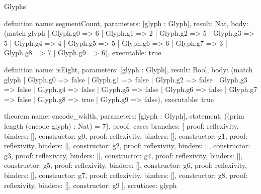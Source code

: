 \begin{lexlean}{Glyphs}
\begin{semanticmodule}
definition{
  name: segmentCount,
  parameters: [glyph : Glyph],
  result: Nat,
  body: (match glyph
    | Glyph.g0 => 6
    | Glyph.g1 => 2
    | Glyph.g2 => 5
    | Glyph.g3 => 5
    | Glyph.g4 => 4
    | Glyph.g5 => 5
    | Glyph.g6 => 6
    | Glyph.g7 => 3
    | Glyph.g8 => 7
    | Glyph.g9 => 6),
  executable: true
}

definition{
  name: isEight,
  parameters: [glyph : Glyph],
  result: Bool,
  body: (match glyph
    | Glyph.g0 => false
    | Glyph.g1 => false
    | Glyph.g2 => false
    | Glyph.g3 => false
    | Glyph.g4 => false
    | Glyph.g5 => false
    | Glyph.g6 => false
    | Glyph.g7 => false
    | Glyph.g8 => true
    | Glyph.g9 => false),
  executable: true
}

theorem{
  name: encode_width,
  parameters: [glyph : Glyph],
  statement: ((prim length (encode glyph) : Nat) = 7),
  proof: cases{
    branches: [
      {proof: reflexivity{}, binders: [], constructor: g0},
      {proof: reflexivity{}, binders: [], constructor: g1},
      {proof: reflexivity{}, binders: [], constructor: g2},
      {proof: reflexivity{}, binders: [], constructor: g3},
      {proof: reflexivity{}, binders: [], constructor: g4},
      {proof: reflexivity{}, binders: [], constructor: g5},
      {proof: reflexivity{}, binders: [], constructor: g6},
      {proof: reflexivity{}, binders: [], constructor: g7},
      {proof: reflexivity{}, binders: [], constructor: g8},
      {proof: reflexivity{}, binders: [], constructor: g9}
    ],
    scrutinee: glyph
  }
}
\end{semanticmodule}
\end{lexlean}
